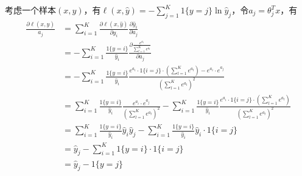 \documentclass[10pt,a4paper]{ctexbook}
\begin{document}
考虑一个样本$(x,y)$，有$\ell(x,\hat{y})=-\sum\limits_{j=1}^{K}{1\{y=j\}\ln{\hat{y}_{j}}}$，令$a_{j}={\theta_{j}^{T}x}$，有
\begin{align*}
{\frac {\partial \ell(x,\hat{y})}{a_{j}}}&=\sum\limits_{i=1}^{K}{{\frac {\partial \ell(x,\hat{y})}{\partial \hat{y}_{i}}}{\frac {\partial \hat{y}_{i}}{\partial a_{j}}}}\\
                                         &=-\sum\limits_{i=1}^{K}{
                                                {\frac {1\{y=i\}}{\hat{y}_{i}}}
                                                {\frac {\partial \frac {e^{a_{i}}}{\sum_{l=1}^{K}{e^{a_{l}}}}}{\partial a_{j}}}}\\
                                         &=-\sum\limits_{i=1}^{K}{
                                                {\frac {1\{y=i\}}{\hat{y}_{i}}}
                                                {\frac {
                                                            e^{a_{i}} \cdot 1\{i=j\} \cdot {\left({\sum_{l=1}^{K}{e^{a_{l}}}}\right)}
                                                            -e^{a_{i}} \cdot e^{a_{j}}
                                                        }
                                                       {\left({\sum_{l=1}^{K}{e^{a_{l}}}}\right)^{2}}
                                                    }}\\
                                         &=\sum\limits_{i=1}^{K}{
                                                {\frac {1\{y=i\}}{\hat{y}_{i}}}
                                                {\frac {e^{a_{i}} \cdot e^{a_{j}}}
                                                       {\left({\sum_{l=1}^{K}{e^{a_{l}}}}\right)^{2}}
                                                    }}
                                            -\sum\limits_{i=1}^{K}{
                                                {\frac {1\{y=i\}}{\hat{y}_{i}}}
                                                {\frac {e^{a_{i}} \cdot 1\{i=j\} \cdot {\left({\sum_{l=1}^{K}{e^{a_{l}}}}\right)}}
                                                       {\left({\sum_{l=1}^{K}{e^{a_{l}}}}\right)^{2}}
                                                    }}\\
                                         &=\sum\limits_{i=1}^{K}{{\frac {1\{y=i\}}{\hat{y}_{i}}}{\hat{y}_{i}}{\hat{y}_{j}}}
                                            -\sum\limits_{i=1}^{K}{{\frac {1\{y=i\}}{\hat{y}_{i}}}{\hat{y}_{i}} \cdot 1\{i=j\}}\\
                                         &={\hat{y}_{j}}-\sum\limits_{i=1}^{K}{{1\{y=i\}}} \cdot 1\{i=j\}\\
                                         &={\hat{y}_{j}}-{1\{y=j\}} \\
\end{align*}
\end{document}
